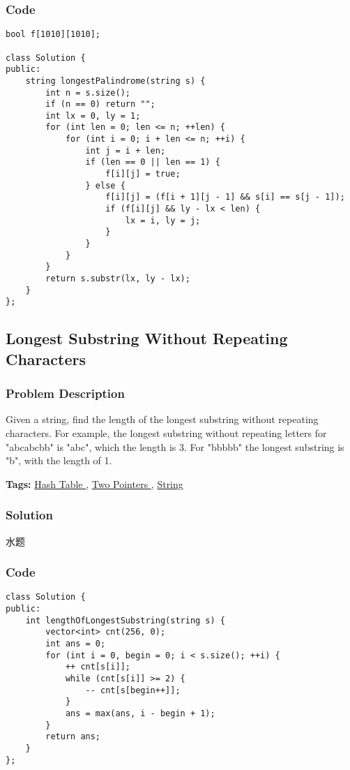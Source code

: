\documentclass{article}
\begin{document}
\begin{CJK*}{UTF8}{gkai}
\subsubsection*{Code}
\begin{lstlisting}
bool f[1010][1010];

class Solution {
public:
    string longestPalindrome(string s) {
        int n = s.size();
        if (n == 0) return "";
        int lx = 0, ly = 1;
        for (int len = 0; len <= n; ++len) {
            for (int i = 0; i + len <= n; ++i) {
                int j = i + len;
                if (len == 0 || len == 1) {
                    f[i][j] = true;
                } else {
                    f[i][j] = (f[i + 1][j - 1] && s[i] == s[j - 1]);
                    if (f[i][j] && ly - lx < len) {
                        lx = i, ly = j;
                    }
                }
            }
        }
        return s.substr(lx, ly - lx);
    }
};

\end{lstlisting}


\subsection{ Longest Substring Without Repeating Characters }
\label{ Longest Substring Without Repeating Characters }

\subsubsection*{Problem Description}
Given a string, find the length of the longest substring without repeating characters. For example, the longest substring without repeating letters for "abcabcbb" is "abc", which the length is 3. For "bbbbb" the longest substring is "b", with the length of 1.


\textbf{Tags: }
\hyperref[ Hash Table ]{ Hash Table },  \hyperref[ Two Pointers ]{ Two Pointers },  \hyperref[ String ]{ String }



\subsubsection*{Solution}
水题

\subsubsection*{Code}
\begin{lstlisting}
class Solution {
public:
    int lengthOfLongestSubstring(string s) {
        vector<int> cnt(256, 0);
        int ans = 0;
        for (int i = 0, begin = 0; i < s.size(); ++i) {
            ++ cnt[s[i]];
            while (cnt[s[i]] >= 2) {
                -- cnt[s[begin++]];
            }
            ans = max(ans, i - begin + 1);
        }
        return ans;
    }
};


\end{lstlisting}
\end{CJK*}
\end{document}
